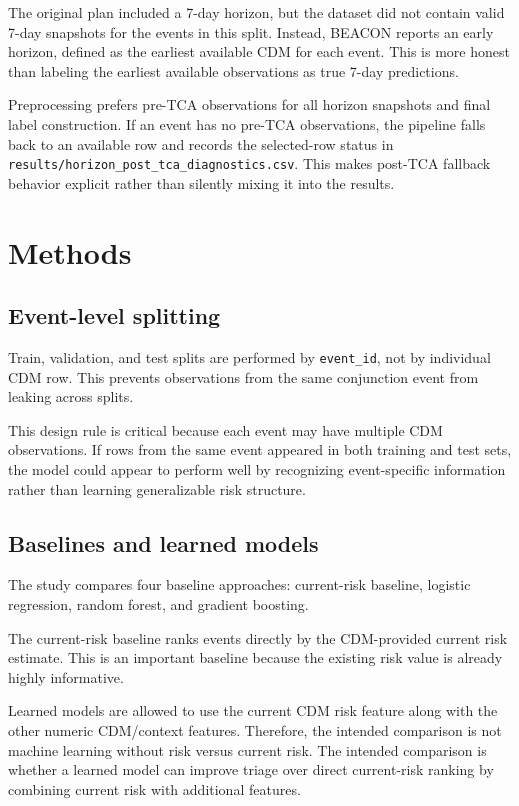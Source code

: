 \documentclass[11pt]{article}
\begin{document}
The original plan included a 7-day horizon, but the dataset did not contain valid 7-day snapshots for the events in this split. Instead, BEACON reports an early horizon, defined as the earliest available CDM for each event. This is more honest than labeling the earliest available observations as true 7-day predictions.

Preprocessing prefers pre-TCA observations for all horizon snapshots and final label construction. If an event has no pre-TCA observations, the pipeline falls back to an available row and records the selected-row status in \texttt{results/horizon\_post\_tca\_diagnostics.csv}. This makes post-TCA fallback behavior explicit rather than silently mixing it into the results.

\FloatBarrier

\section{Methods}

\subsection{Event-level splitting}

Train, validation, and test splits are performed by \texttt{event\_id}, not by individual CDM row. This prevents observations from the same conjunction event from leaking across splits.

This design rule is critical because each event may have multiple CDM observations. If rows from the same event appeared in both training and test sets, the model could appear to perform well by recognizing event-specific information rather than learning generalizable risk structure.

\subsection{Baselines and learned models}

The study compares four baseline approaches: current-risk baseline, logistic regression, random forest, and gradient boosting.

The current-risk baseline ranks events directly by the CDM-provided current risk estimate. This is an important baseline because the existing risk value is already highly informative.

Learned models are allowed to use the current CDM risk feature along with the other numeric CDM/context features. Therefore, the intended comparison is not machine learning without risk versus current risk. The intended comparison is whether a learned model can improve triage over direct current-risk ranking by combining current risk with additional features.
\end{document}
